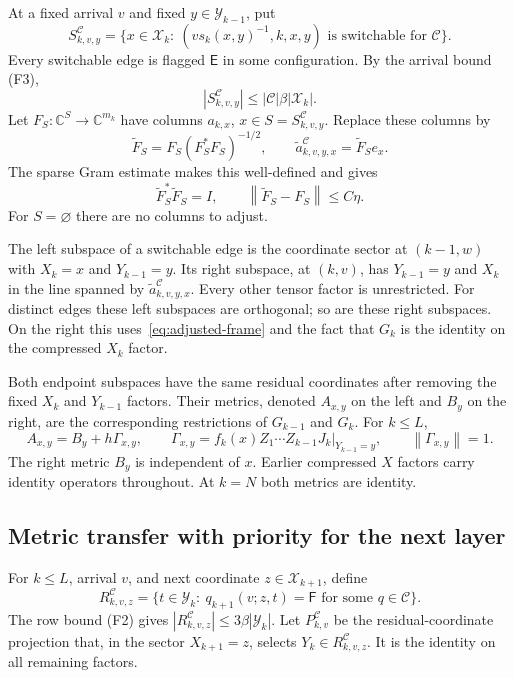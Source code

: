 \documentclass[11pt]{article}
\numberwithin{equation}{section}
\theoremstyle{definition}
\theoremstyle{remark}
\newcommand{\norm}[1]{\left\lVert#1\right\rVert}
\newcommand{\abs}[1]{\left\lvert#1\right\rvert}
\newcommand{\E}{\mathsf E}
\newcommand{\F}{\mathsf F}
\newcommand{\cX}{\mathcal X}
\newcommand{\cY}{\mathcal Y}
\newcommand{\cC}{\mathcal C}
\begin{document}
At a fixed arrival $v$ and fixed $y\in\cY_{k-1}$, put
\begin{equation}\label{eq:switchable-set}
 S_{k,v,y}^{\cC}=
 \{x\in\cX_k:\ (vs_k(x,y)^{-1},k,x,y)
                 \text{ is switchable for }\cC\}.
\end{equation}
Every switchable edge is flagged $\E$ in some configuration. By the
arrival bound (F3),
\begin{equation}\label{eq:switchable-size}
 \abs{S_{k,v,y}^{\cC}}\le\abs{\cC}\beta\abs{\cX_k}.
\end{equation}
Let $F_S:\mathbb C^S\to\mathbb C^{m_k}$ have columns $a_{k,x}$,
$x\in S=S_{k,v,y}^{\cC}$. Replace these columns by
\begin{equation}\label{eq:adjusted-frame}
 \widetilde F_S=F_S(F_S^*F_S)^{-1/2},
 \qquad \widetilde a_{k,v,y,x}^{\cC}=\widetilde F_Se_x.
\end{equation}
The sparse Gram estimate makes this well-defined and gives
\begin{equation}\label{eq:frame-adjustment}
 \widetilde F_S^*\widetilde F_S=I,
 \qquad \norm{\widetilde F_S-F_S}\le C\eta.
\end{equation}
For $S=\varnothing$ there are no columns to adjust.

The left subspace of a switchable edge is the coordinate sector at
$(k-1,w)$ with $X_k=x$ and $Y_{k-1}=y$. Its right subspace, at $(k,v)$,
has $Y_{k-1}=y$ and $X_k$ in the line spanned by
$\widetilde a_{k,v,y,x}^{\cC}$. Every other tensor factor is unrestricted.
For distinct edges these left subspaces are orthogonal; so are these
right subspaces. On the right this uses~\eqref{eq:adjusted-frame} and the
fact that $G_k$ is the identity on the compressed $X_k$ factor.

Both endpoint subspaces have the same residual coordinates after removing
the fixed $X_k$ and $Y_{k-1}$ factors. Their metrics, denoted $A_{x,y}$ on
the left and $B_y$ on the right, are the corresponding restrictions of
$G_{k-1}$ and $G_k$. For $k\le L$,
\begin{equation}\label{eq:edge-metrics}
 A_{x,y}=B_y+h\Gamma_{x,y},\qquad
 \Gamma_{x,y}=f_k(x)Z_1\cdots Z_{k-1}J_k\big|_{Y_{k-1}=y},
 \qquad \norm{\Gamma_{x,y}}=1.
\end{equation}
The right metric $B_y$ is independent of $x$. Earlier compressed $X$
factors carry identity operators throughout. At $k=N$ both metrics are
identity.

\subsection{Metric transfer with priority for the next layer}
For $k\le L$, arrival $v$, and next coordinate $z\in\cX_{k+1}$, define
\begin{equation}\label{eq:priority-set}
 R_{k,v,z}^{\cC}=
 \{t\in\cY_k:\ q_{k+1}(v;z,t)=\F
                         \text{ for some }q\in\cC\}.
\end{equation}
The row bound (F2) gives $\abs{R_{k,v,z}^{\cC}}\le3\beta\abs{\cY_k}$.
Let $P_{k,v}^{\cC}$ be the residual-coordinate projection that, in the
sector $X_{k+1}=z$, selects $Y_k\in R_{k,v,z}^{\cC}$. It is the identity
on all remaining factors.
\end{document}
